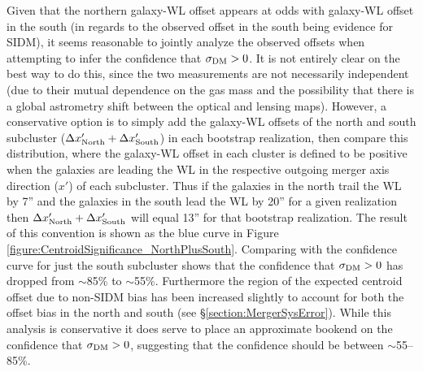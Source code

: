 Given that the northern galaxy-WL offset appears at odds with galaxy-WL offset in the south (in regards to the observed offset in the south being evidence for SIDM), it seems reasonable to jointly analyze the observed offsets when attempting to infer the confidence that $\sigma_{\rm DM}>0$. 
It is not entirely clear on the best way to do this, since the two measurements are not necessarily independent (due to their mutual dependence on the gas mass and the possibility that there is a global astrometry shift between the optical and lensing maps). 
However, a conservative option is to simply add the galaxy-WL offsets of the north and south subcluster ($\Delta x'_{\rm North}+\Delta x'_{\rm South}$) in each bootstrap realization, then compare this distribution, where the galaxy-WL offset in each cluster is defined to be positive when the galaxies are leading the WL in the respective outgoing merger axis direction ($x'$) of each subcluster.
Thus if the galaxies in the north trail the WL by 7'' and the galaxies in the south lead the WL by 20'' for a given realization then $\Delta x'_{\rm North}+\Delta x'_{\rm South}$ will equal 13'' for that bootstrap realization.
The result of this convention is shown as the blue curve in Figure \ref{figure:CentroidSignificance_NorthPlusSouth}.
Comparing with the confidence curve for just the south subcluster shows that the confidence that $\sigma_{\rm DM}>0$ has dropped from $\sim$85\% to $\sim$55\%.
Furthermore the region of the expected centroid offset due to non-SIDM bias has been increased slightly to account for both the offset bias in the north and south (see \S\ref{section:MergerSysError}).
While this analysis is conservative it does serve to place an approximate bookend on the confidence that $\sigma_{\rm DM}>0$, suggesting that the confidence should be between $\sim$55--85\%.

